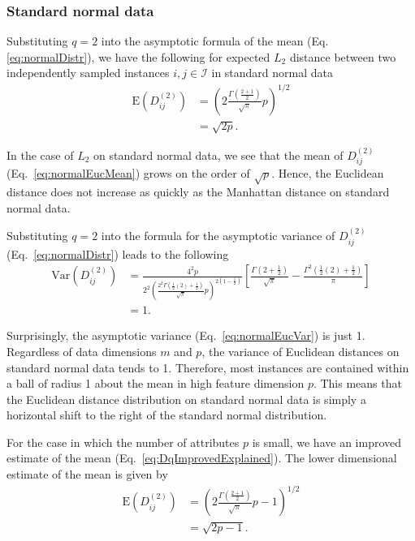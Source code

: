 \documentclass[10pt,letterpaper]{article}
\begin{document}
\subsubsection*{Standard normal data}

Substituting $q=2$ into the asymptotic formula of the mean (Eq. \ref{eq:normalDistr}), we have the following for expected $L_2$ distance between two independently sampled instances $i,j \in \mathcal{I}$ in standard normal data
%
\begin{equation}\label{eq:normalEucMean}
\begin{aligned}
\text{E}\left(D^{(2)}_{ij}\right) &= \left(2\frac{\Gamma\left(\frac{2 + 1}{2}\right)}{\sqrt{\pi}}p\right)^{1/2} \\
&= \sqrt{2p}.
\end{aligned}
\end{equation}

In the case of $L_2$ on standard normal data, we see that the mean of $D^{(2)}_{ij}$ (Eq.~\ref{eq:normalEucMean}) grows on the order of $\sqrt{p}$. Hence, the Euclidean distance does not increase as quickly as the Manhattan distance on standard normal data.

Substituting $q=2$ into the formula for the asymptotic variance of $D^{(2)}_{ij}$ (Eq.~\ref{eq:normalDistr}) leads to the following
%
\begin{equation}\label{eq:normalEucVar}
\begin{aligned}
\text{Var}\left(D^{(2)}_{ij}\right) &= \frac{4^2p}{2^2\left(\frac{2^2\Gamma\left(\frac{1}{2}(2) + \frac{1}{2}\right)}{\sqrt{\pi}}p\right)^{2\left(1 - \frac{1}{2}\right)}}\left[\frac{\Gamma\left(2 + \frac{1}{2}\right)}{\sqrt{\pi}} - \frac{\Gamma^2\left(\frac{1}{2}(2) + \frac{1}{2}\right)}{\pi}\right] \\
&= 1.
\end{aligned}
\end{equation}

Surprisingly, the asymptotic variance (Eq.~\ref{eq:normalEucVar}) is just 1. Regardless of data dimensions $m$ and $p$, the variance of Euclidean distances on standard normal data tends to 1. Therefore, most instances are contained within a ball of radius 1 about the mean in high feature dimension $p$. This means that the Euclidean distance distribution on standard normal data is simply a horizontal shift to the right of the standard normal distribution.

For the case in which the number of attributes $p$ is small, we have an improved estimate of the mean (Eq.~\ref{eq:DqImprovedExplained}). The lower dimensional estimate of the mean is given by
%
\begin{equation}\label{eq:normalEucMeanImproved}
\begin{aligned}
\text{E}\left(D^{(2)}_{ij}\right) &= \left(2\frac{\Gamma\left(\frac{2 + 1}{2}\right)}{\sqrt{\pi}}p - 1\right)^{1/2} \\
&= \sqrt{2p - 1}.
\end{aligned}
\end{equation}
\end{document}
